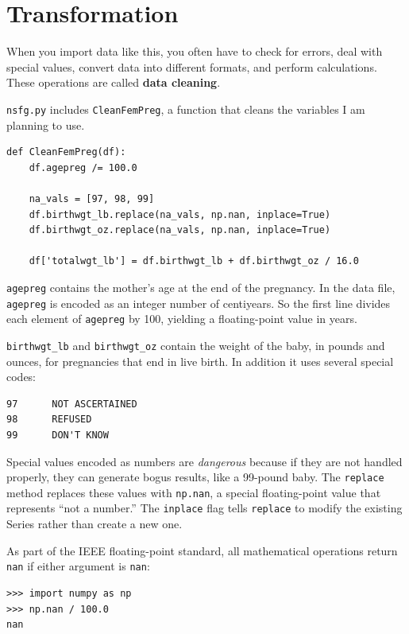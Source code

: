 \documentclass[12pt]{book}
\begin{document}
\section{Transformation}
\label{cleaning}

When you import data like this, you often have to check for errors,
deal with special values, convert data into different formats, and
perform calculations.  These operations are called {\bf data cleaning}.

{\tt nsfg.py} includes {\tt CleanFemPreg}, a function that cleans
the variables I am planning to use.

\begin{verbatim}
def CleanFemPreg(df):
    df.agepreg /= 100.0

    na_vals = [97, 98, 99]
    df.birthwgt_lb.replace(na_vals, np.nan, inplace=True)
    df.birthwgt_oz.replace(na_vals, np.nan, inplace=True)

    df['totalwgt_lb'] = df.birthwgt_lb + df.birthwgt_oz / 16.0    
\end{verbatim}

{\tt agepreg} contains the mother's age at the end of the
pregnancy.  In the data file, {\tt agepreg} is encoded as an integer
number of centiyears.  So the first line divides each element
of {\tt agepreg} by 100, yielding a floating-point value in
years.

\verb"birthwgt_lb" and \verb"birthwgt_oz" contain the weight of the
baby, in pounds and ounces, for pregnancies that end in live birth.
In addition it uses several special codes:

\begin{verbatim}
97      NOT ASCERTAINED
98      REFUSED
99      DON'T KNOW
\end{verbatim}

Special values encoded as numbers are {\em dangerous\/} because if they
are not handled properly, they can generate bogus results, like
a 99-pound baby.  The {\tt replace} method replaces these values with
{\tt np.nan}, a special floating-point value that represents ``not a
number.''  The {\tt inplace} flag tells {\tt replace} to modify the
existing Series rather than create a new one.

As part of the IEEE floating-point standard, all mathematical
operations return {\tt nan} if either argument is {\tt nan}:

\begin{verbatim}
>>> import numpy as np
>>> np.nan / 100.0
nan
\end{verbatim}
\end{document}

